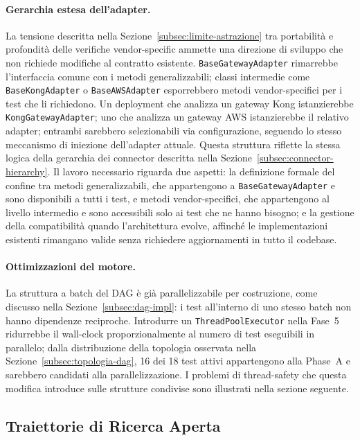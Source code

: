 \paragraph{Gerarchia estesa dell'adapter.}
La tensione descritta nella Sezione~\ref{subsec:limite-astrazione} tra portabilità e profondità delle verifiche vendor-specific ammette una direzione di sviluppo che non richiede modifiche al contratto esistente. \texttt{BaseGatewayAdapter} rimarrebbe l'interfaccia comune con i metodi generalizzabili; classi intermedie come \texttt{BaseKongAdapter} o \texttt{BaseAWSAdapter} esporrebbero metodi vendor-specifici per i test che li richiedono. Un deployment che analizza un gateway Kong istanzierebbe \texttt{KongGatewayAdapter}; uno che analizza un gateway AWS istanzierebbe il relativo adapter; entrambi sarebbero selezionabili via configurazione, seguendo lo stesso meccanismo di iniezione dell'adapter attuale. Questa struttura riflette la stessa logica della gerarchia dei connector descritta nella Sezione~\ref{subsec:connector-hierarchy}. Il lavoro necessario riguarda due aspetti: la definizione formale del confine tra metodi generalizzabili, che appartengono a \texttt{BaseGatewayAdapter} e sono disponibili a tutti i test, e metodi vendor-specifici, che appartengono al livello intermedio e sono accessibili solo ai test che ne hanno bisogno; e la gestione della compatibilità quando l'architettura evolve, affinché le implementazioni esistenti rimangano valide senza richiedere aggiornamenti in tutto il codebase.

\paragraph{Ottimizzazioni del motore.}
La struttura a batch del \gls{DAG} è già parallelizzabile per costruzione, come discusso nella Sezione~\ref{subsec:dag-impl}: i test all'interno di uno stesso batch non hanno dipendenze reciproche. Introdurre un \texttt{ThreadPoolExecutor} nella Fase~5 ridurrebbe il wall-clock proporzionalmente al numero di test eseguibili in parallelo; dalla distribuzione della topologia osservata nella Sezione~\ref{subsec:topologia-dag}, 16 dei 18 test attivi appartengono alla Phase~A e sarebbero candidati alla parallelizzazione. I problemi di thread-safety che questa modifica introduce sulle strutture condivise sono illustrati nella sezione seguente.


\subsection{Traiettorie di Ricerca Aperta}\label{subsec:ricerca-aperta}

